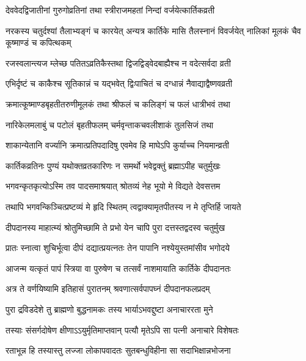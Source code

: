 \twolineshloka
{देववेदद्विजातीनां गुरुगोव्रतिनां तथा}
{स्त्रीराजमहतां निन्दां वर्जयेत्कार्तिकव्रती} %

\threelineshloka
{नरकस्य चतुर्दश्यां तैलाभ्यङ्गं च कारयेत्}
{अन्यत्र कार्तिके मासि तैलस्नानं विवर्जयेत्}
{नालिकां मूलकं चैव कूष्माण्डं च कपित्थकम्} %

\twolineshloka
{रजस्वलान्त्यज म्लेच्छ पतितऽव्रतिकैस्तथा}
{द्विजद्विड्वेदबाह्यैश्च न वदेत्सर्वदा व्रती} %

\twolineshloka
{एभिर्दृष्टं च काकैश्च सूतिकान्नं च यद्भवेत्}
{द्विःपाचितं च दग्धान्नं नैवाद्याद्वैष्णवव्रती} %

\twolineshloka
{क्रमात्कूष्माण्डबृहतीतरुणीमूलकं तथा}
{श्रीफलं च कलिङ्गं च फलं धात्रीभवं तथा} %

\twolineshloka
{नारिकेलमलाबुं च पटोलं बृहतीफलम्}
{चर्मवृन्ताकचवलीशाकं तुलसिजं तथा} %

\twolineshloka
{शाकान्येतानि वर्ज्यानि क्रमात्प्रतिपदादिषु}
{एवमेव हि माघेऽपि कुर्याच्च नियमान्व्रती} %

\twolineshloka
{कार्तिकव्रतिनः पुण्यं यथोक्तव्रतकारिणः}
{न समर्थो भवेद्वक्तुं ब्रह्माऽपीह चतुर्मुखः} %





\twolineshloka
{भगवन्कृतकृत्योऽस्मि तव पादसमाश्रयात्}
{श्रोतव्यं नेह भूयो मे विद्यते देवसत्तम} %

\twolineshloka
{तथापि भगवन्किञ्चित्प्रष्टव्यं मे हृदि स्थितम्}
{त्वद्वाक्यामृतपीतस्य न मे तृप्तिर्हि जायते} %

\twolineshloka
{दीपदानस्य माहात्म्यं श्रोतुमिच्छामि ते प्रभो}
{येन चापि पुरा दत्तस्तद्वदस्व चतुर्मुख} %


\twolineshloka
{प्रातः स्नात्वा शुचिर्भूत्वा दीपं दद्यात्प्रयत्नतः}
{तेन पापानि नश्येयुस्तमांसीव भगोदये} %

\twolineshloka
{आजन्म यत्कृतं पापं स्त्रिया वा पुरुषेण च}
{तत्सर्वं नाशमायाति कार्तिके दीपदानतः} %

\twolineshloka
{अत्र ते वर्णयिष्यामि इतिहासं पुरातनम्}
{श्रवणात्सर्वपापघ्नं दीपदानफलप्रदम्} %

\twolineshloka
{पुरा द्रविडदेशे तु ब्राह्मणो बुद्धनामकः}
{तस्य भार्याऽभवद्दुष्टा अनाचाररता मुने} %

\twolineshloka
{तस्याः संसर्गदोषेण क्षीणाऽऽयुर्मृतिमाप्तवान्}
{पत्यौ मृतेऽपि सा पत्नी अनाचारे विशेषतः} %

\twolineshloka
{रताभून्न हि तस्यास्तु लज्जा लोकापवादतः}
{सुतबन्धुविहीना सा सदाभिक्षान्नभोजना} %

